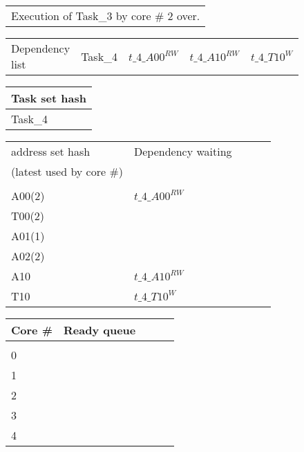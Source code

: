 \documentclass{article}
\begin{document}
\begin{figure}
\begin{minipage}{1.0\linewidth}
\begin{tabular}{l}
Execution of Task\_3 by core \# 2 over.
\end{tabular}
\end{minipage}


\begin{minipage}{1.0\linewidth}
\begin{tabular}{l | l  l l l }
Dependency list & Task\_4 & \cellcolor{LimeGreen}$t\_4\_A00^{RW}$ & \cellcolor{LimeGreen}$t\_4\_A10^{RW}$ & \cellcolor{LimeGreen}$t\_4\_T10^{W}$\\
\end{tabular}
\end{minipage}

\begin{minipage}{1.0\linewidth}
\begin{tabular}{l}
Task set hash\\
\hline
\cellcolor{LimeGreen}Task\_4\\
\end{tabular}
\end{minipage}

\begin{minipage}{1.0\linewidth}
\begin{tabular}{l | l l l l}
address set hash & Dependency waiting\\
(latest used by core \#) & \\
\hline
&\\
A00(2) & \cellcolor{LimeGreen} $t\_4\_A00^{RW}$&&&\\
T00(2) &                                       &&&\\
A01(1) &                                       &&&\\
A02(2) &                                       &&&\\
A10 & \cellcolor{LimeGreen}$t\_4\_A10^{RW}$    &&&\\
T10 & \cellcolor{LimeGreen}$t\_4\_T10^{W}$     &&&\\
\end{tabular}
\end{minipage}

\begin{minipage}{1.0\linewidth}
\begin{tabular}{l | l l l l}
Core \# & Ready queue\\
\hline
&\\
0 & & & &\\
1 & & & &\\
2 & & & &\\
3 & & & &\\
4 & & & &\\
\end{tabular}
\end{minipage}


\end{figure}
\end{document}
